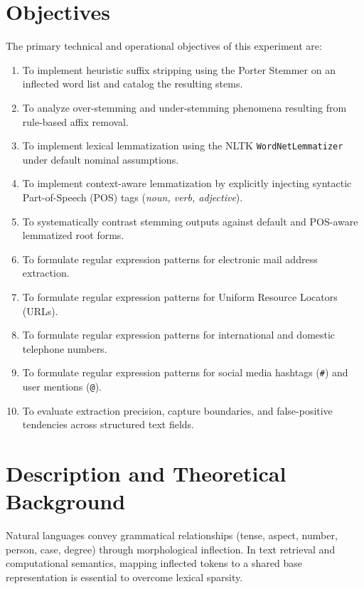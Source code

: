 \documentclass[12pt,a4paper]{report}
\begin{document}
\section{Objectives}
The primary technical and operational objectives of this experiment are:
\begin{enumerate}[label=\textbf{\arabic*.}]
    \item To implement heuristic suffix stripping using the Porter Stemmer on an inflected word list and catalog the resulting stems.
    \item To analyze over-stemming and under-stemming phenomena resulting from rule-based affix removal.
    \item To implement lexical lemmatization using the NLTK \texttt{WordNetLemmatizer} under default nominal assumptions.
    \item To implement context-aware lemmatization by explicitly injecting syntactic Part-of-Speech (POS) tags (\textit{noun, verb, adjective}).
    \item To systematically contrast stemming outputs against default and POS-aware lemmatized root forms.
    \item To formulate regular expression patterns for electronic mail address extraction.
    \item To formulate regular expression patterns for Uniform Resource Locators (URLs).
    \item To formulate regular expression patterns for international and domestic telephone numbers.
    \item To formulate regular expression patterns for social media hashtags (\texttt{\#}) and user mentions (\texttt{@}).
    \item To evaluate extraction precision, capture boundaries, and false-positive tendencies across structured text fields.
\end{enumerate}

\section{Description and Theoretical Background}
Natural languages convey grammatical relationships (tense, aspect, number, person, case, degree) through morphological inflection. In text retrieval and computational semantics, mapping inflected tokens to a shared base representation is essential to overcome lexical sparsity.
\end{document}

